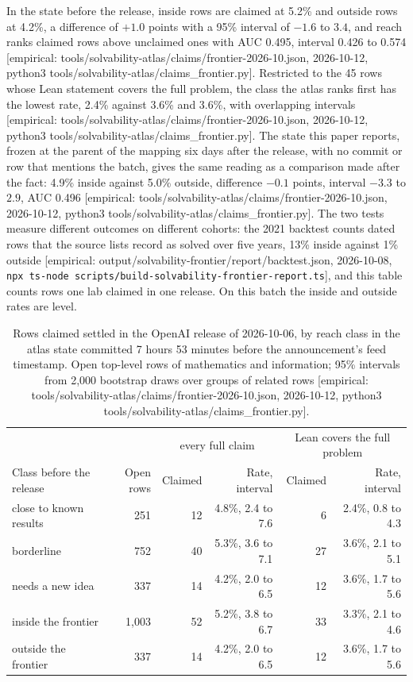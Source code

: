 \documentclass[11pt]{article}
\newcommand{\emp}[1]{\textcolor{bucketgray}{\footnotesize [empirical: #1]}}
\newcommand{\cmd}{\texttt{npx ts-node scripts/build-solvability-frontier-report.ts}}
\newcommand{\bt}{\emp{output/solvability-frontier/report/backtest.json, 2026-10-08, \cmd}}
\newcommand{\cl}{\emp{tools/solvability-atlas/claims/frontier-2026-10.json, 2026-10-12, python3 tools/solvability-atlas/claims\_frontier.py}}
\begin{document}
In the state before the release, inside rows are claimed at 5.2\% and outside rows at 4.2\%, a difference of $+1.0$ points with a 95\% interval of $-1.6$ to $3.4$, and reach ranks claimed rows above unclaimed ones with AUC 0.495, interval 0.426 to 0.574 \cl. Restricted to the 45 rows whose Lean statement covers the full problem, the class the atlas ranks first has the lowest rate, 2.4\% against 3.6\% and 3.6\%, with overlapping intervals \cl. The state this paper reports, frozen at the parent of the mapping six days after the release, with no commit or row that mentions the batch, gives the same reading as a comparison made after the fact: 4.9\% inside against 5.0\% outside, difference $-0.1$ points, interval $-3.3$ to $2.9$, AUC 0.496 \cl. The two tests measure different outcomes on different cohorts: the 2021 backtest counts dated rows that the source lists record as solved over five years, 13\% inside against 1\% outside \bt, and this table counts rows one lab claimed in one release. On this batch the inside and outside rates are level.

\begin{table}[htbp]
  \centering
  \caption{Rows claimed settled in the OpenAI release of 2026-10-06, by reach class in the atlas state committed 7 hours 53 minutes before the announcement's feed timestamp. Open top-level rows of mathematics and information; 95\% intervals from 2,000 bootstrap draws over groups of related rows \cl.}
  \label{tab:october}
  \small
  \begin{tabular}{lrrrrr}
    \toprule
    & & \multicolumn{2}{c}{every full claim} & \multicolumn{2}{c}{Lean covers the full problem} \\
    Class before the release & Open rows & Claimed & Rate, interval & Claimed & Rate, interval \\
    \midrule
    close to known results & 251 & 12 & 4.8\%, 2.4 to 7.6 & 6 & 2.4\%, 0.8 to 4.3 \\
    borderline & 752 & 40 & 5.3\%, 3.6 to 7.1 & 27 & 3.6\%, 2.1 to 5.1 \\
    needs a new idea & 337 & 14 & 4.2\%, 2.0 to 6.5 & 12 & 3.6\%, 1.7 to 5.6 \\
    \midrule
    inside the frontier & 1,003 & 52 & 5.2\%, 3.8 to 6.7 & 33 & 3.3\%, 2.1 to 4.6 \\
    outside the frontier & 337 & 14 & 4.2\%, 2.0 to 6.5 & 12 & 3.6\%, 1.7 to 5.6 \\
    \bottomrule
  \end{tabular}
\end{table}
\end{document}
